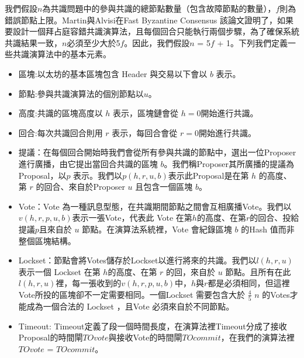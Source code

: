 我們假設$n$為共識問題中的參與共識的總節點數量（包含故障節點的數量），$f$則為錯誤節點上限。Martin與Alvisi在Fast Byzantine Consensus \cite{martin2006fast}該論文證明了，如果要設計一個拜占庭容錯共識演算法，且每個回合只能執行兩個步驟，為了確保系統共識結果一致，$n$必須至少大於5$f$。因此，我們假設$n$ = 5$f$ + 1。下列我們定義一些共識演算法中的基本元素。
\begin{itemize}%
\item  區塊:以太坊的基本區塊包含 Header 與交易以下會以 $b$ 表示。
\item  節點:參與共識演算法的個別節點以$u$。
\item  高度:共識的區塊高度以 $h$ 表示，區塊鏈會從 $h=0$開始進行共識。
\item  回合:每次共識回合則用 $r$ 表示，每回合會從 $r=0$開始進行共識。
\item  提議：在每個回合開始時我們會從所有參與共識的節點中，選出一位Proposer進行廣播，由它提出當回合共識的區塊 $b$。我們稱Proposer其所廣播的提議為Proposal，以$p$ 表示。我們以$p(h,r,u,b)$表示此Proposal是在第 $h$ 的高度、第 $r$ 的回合、來自於Proposer $u$ 且包含一個區塊 $b$。
\item  Vote：Vote 為一種訊息型態，在共識期間節點之間會互相廣播Vote。我們以 $v(h,r,p,u,b)$表示一張Vote，代表此 Vote 在第$h$的高度、在第$r$的回合、投給提議$p$且來自於 $u$ 節點。在演算法系統裡，Vote 會紀錄區塊 $b$ 的Hash 值而非整個區塊結構。

\item  Lockset：節點會將Votes儲存於Lockset以進行將來的共識。我們以$l(h,r,u)$ 表示一個 Lockset 在第 $h$的高度、在第 $r$ 的回，來自於 $u$ 節點。且所有在此 $l(h,r,u)$裡，每一張收到的$v(h,r,p,u,b)$中，$h$與$r$都是必須相同，但這裡Vote所投的區塊卻不一定需要相同。一個Lockset 需要包含大於 $\frac{4}{5}$ $n$ 的Votes才能成為一個合法的 Lockset ，且Vote 必須來自於不同節點。
\item Timeout: Timeout定義了段一個時間長度，在演算法裡Timeout分成了接收Proposal的時間閘$TOvote$與接收Vote的時間閘$TOcommit$，在我們的演算法裡$TOvote$ = $TOcommit$。 

\end{itemize}